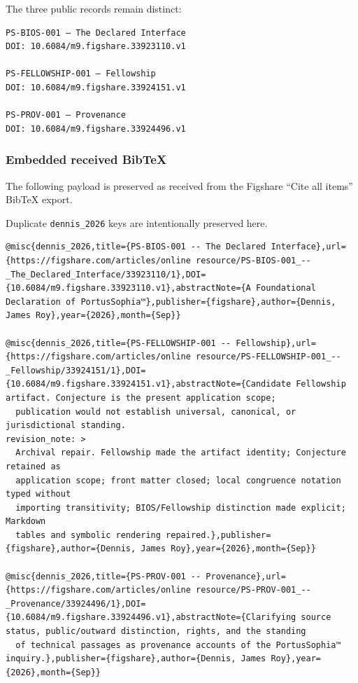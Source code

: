 The three public records remain distinct:

\begin{verbatim}
PS-BIOS-001 — The Declared Interface
DOI: 10.6084/m9.figshare.33923110.v1

PS-FELLOWSHIP-001 — Fellowship
DOI: 10.6084/m9.figshare.33924151.v1

PS-PROV-001 — Provenance
DOI: 10.6084/m9.figshare.33924496.v1
\end{verbatim}

\subsubsection{Embedded received BibTeX}\label{embedded-received-bibtex}

The following payload is preserved as received from the Figshare ``Cite
all items'' BibTeX export.

Duplicate \texttt{dennis\_2026} keys are intentionally preserved here.

\begin{verbatim}
@misc{dennis_2026,title={PS-BIOS-001 -- The Declared Interface},url={https://figshare.com/articles/online resource/PS-BIOS-001_--_The_Declared_Interface/33923110/1},DOI={10.6084/m9.figshare.33923110.v1},abstractNote={A Foundational Declaration of PortusSophia™},publisher={figshare},author={Dennis, James Roy},year={2026},month={Sep}}

@misc{dennis_2026,title={PS-FELLOWSHIP-001 -- Fellowship},url={https://figshare.com/articles/online resource/PS-FELLOWSHIP-001_--_Fellowship/33924151/1},DOI={10.6084/m9.figshare.33924151.v1},abstractNote={Candidate Fellowship artifact. Conjecture is the present application scope;
  publication would not establish universal, canonical, or jurisdictional standing.
revision_note: >
  Archival repair. Fellowship made the artifact identity; Conjecture retained as
  application scope; front matter closed; local congruence notation typed without
  importing transitivity; BIOS/Fellowship distinction made explicit; Markdown
  tables and symbolic rendering repaired.},publisher={figshare},author={Dennis, James Roy},year={2026},month={Sep}}

@misc{dennis_2026,title={PS-PROV-001 -- Provenance},url={https://figshare.com/articles/online resource/PS-PROV-001_--_Provenance/33924496/1},DOI={10.6084/m9.figshare.33924496.v1},abstractNote={Clarifying source status, public/outward distinction, rights, and the standing
  of technical passages as provenance accounts of the PortusSophia™ inquiry.},publisher={figshare},author={Dennis, James Roy},year={2026},month={Sep}}
\end{verbatim}


